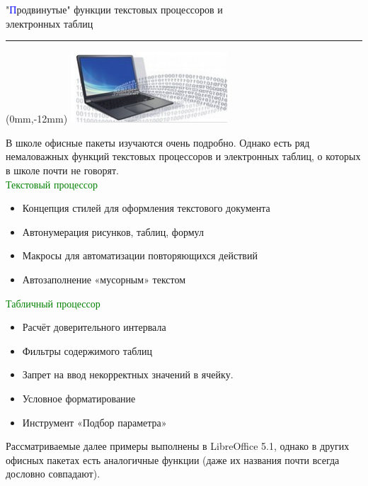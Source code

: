 \documentclass[9pt]{beamer}
\begin{document}
	\begin{frame}
	\begin{flushright}
	\vspace{1em}
		\large{"\textcolor{blue}{П}родвинутые" функции текстовых процессоров и \\ электронных таблиц}
		\\ \rule{10cm}{0.4pt}
	\end{flushright}
	\begin{textblock*}{0mm}(0mm,-12mm)
		\includegraphics[scale=0.7]{balakshin.png}
	\end{textblock*}
	\vspace{2em}
	В школе офисные пакеты изучаются очень подробно. Однако есть ряд немаловажных
функций текстовых процессоров и электронных таблиц, о которых в школе почти не говорят.\\
	\textcolor{green}{Текстовый процессор}
	\begin{itemize}
	\item Концепция стилей для оформления текстового документа
\item Автонумерация рисунков, таблиц, формул
\item Макросы для автоматизации повторяющихся действий
\item Автозаполнение «мусорным» текстом
	\end{itemize}
	\textcolor{green}{Табличный процессор}
	\begin{itemize}
	\item Расчёт доверительного интервала
\item Фильтры содержимого таблиц
\item Запрет на ввод некорректных значений в ячейку.
\item Условное форматирование
\item Инструмент «Подбор параметра»
	\end{itemize}
	Рассматриваемые далее примеры выполнены в LibreOffice 5.1, однако в других офисных
пакетах есть аналогичные функции (даже их названия почти всегда дословно совпадают).
	\end{frame}
\end{document}
